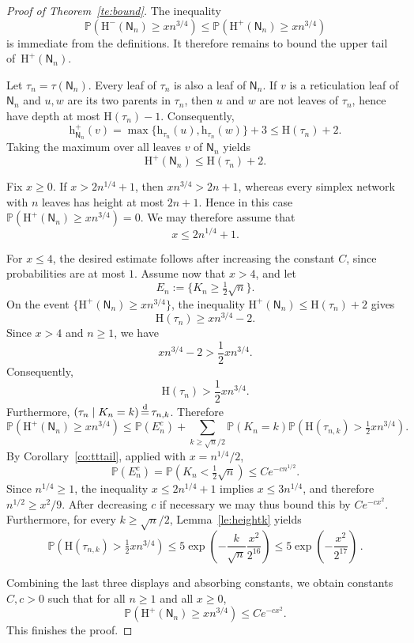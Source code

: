 \documentclass[english,11pt]{smfart}
\newcommand{\Prb}[1]{\mathbb{P}\left(#1\right)}
\newcommand{\eqdist}{\,{\buildrel \mathrm{d} \over =}\,}
\newcommand{\He}{\mathrm{H}}
\newcommand{\he}{\mathrm{h}}
\newcommand{\mN}{\mathsf{N}}
\numberwithin{equation}{section}
\begin{document}
\begin{proof}[Proof of Theorem~\ref{te:bound}]
	The inequality
	\[
		\Prb{\He^-(\mN_n) \ge x n^{3/4}} \le \Prb{\He^+(\mN_n) \ge x n^{3/4}}
	\]
	is immediate from the definitions. It therefore remains to bound the upper tail of~$\He^+(\mN_n)$.
	\smallskip
    
	Let $\tau_n = \tau(\mN_n)$. Every leaf of $\tau_n$ is also a leaf of $\mN_n$. If $v$ is a reticulation leaf of $\mN_n$ and $u,w$ are its two parents in $\tau_n$, then $u$ and $w$ are not leaves of $\tau_n$, hence have depth at most $\He(\tau_n)-1$. Consequently,
	\[
	\he^+_{\mN_n}(v)=\max\{ \he_{\tau_n}(u), \he_{\tau_n}(w)\} + 3 \le \He(\tau_n)+2.
	\]
	Taking the maximum over all leaves $v$ of $\mN_n$ yields
	\[
	\He^+(\mN_n)\le \He(\tau_n)+2.
	\]
	
	Fix $x \ge 0$. If $x > 2n^{1/4}+1$, then $x n^{3/4}>2n+1$, whereas every simplex network with $n$ leaves has height at most $2n+1$. Hence in this case $\Prb{\He^+(\mN_n) \ge x n^{3/4}} = 0$. We may therefore assume that \[
	x\le 2n^{1/4}+1.
	\]
	
	For \(x\le4\), the desired estimate follows after increasing the constant
\(C\), since probabilities are at most \(1\). Assume now that \(x>4\),
and let
\[
E_n:=\{K_n\ge\tfrac12\sqrt n\}.
\]
On the event \(\{\He^+(\mN_n)\ge xn^{3/4}\}\), the inequality
\(\He^+(\mN_n)\le\He(\tau_n)+2\) gives
\[
\He(\tau_n)\ge xn^{3/4}-2.
\]
Since \(x>4\) and \(n\ge1\), we have
\[
xn^{3/4}-2>\frac12xn^{3/4}.
\]
Consequently,
\[
\He(\tau_n)>\frac12xn^{3/4}.
\]
Furthermore, \((\tau_n\mid K_n=k)\eqdist\tau_{n,k}\). Therefore
	\[
	\Prb{\He^+(\mN_n)\ge x n^{3/4}}
	\le
	\Prb{E_n^c}
	+
	\sum_{k\ge \sqrt n/2}\Prb{K_n=k}\Prb{\He(\tau_{n,k})> \tfrac12 x n^{3/4}}.
	\]
	By Corollary~\ref{co:tttail}, applied with $x= n^{1/4}/2$,
	\[
	\Prb{E_n^c}
	=
	\Prb{K_n<\tfrac12\sqrt n}
	\le C e^{-c n^{1/2}}.
	\]
Since $n^{1/4}\ge 1$, the inequality $x\le 2n^{1/4}+1$ implies $x\le 3n^{1/4}$, and therefore $n^{1/2}\ge x^2/9$. After decreasing $c$ if necessary we may thus bound this by $C e^{-c x^2}$. Furthermore, for every $k\ge \sqrt n/2$, Lemma~\ref{le:heightk} yields
	\[
	\Prb{\He(\tau_{n,k})> \tfrac12 x n^{3/4}}
	\le 5\exp\!\left(-\frac{k}{\sqrt{n}}\frac{x^2}{2^{16}}\right)
	\le 5\exp\!\left(-\frac{x^2}{2^{17}}\right)\,.
	\]
    
	Combining the last three displays and absorbing constants, we obtain constants $C,c>0$ such that for all $n\ge 1$ and all $x\ge 0$,
	\[
	\Prb{\He^+(\mN_n)\ge x n^{3/4}}\le C e^{-c x^2}.
	\]
	This finishes the proof.
\end{proof}
\end{document}
